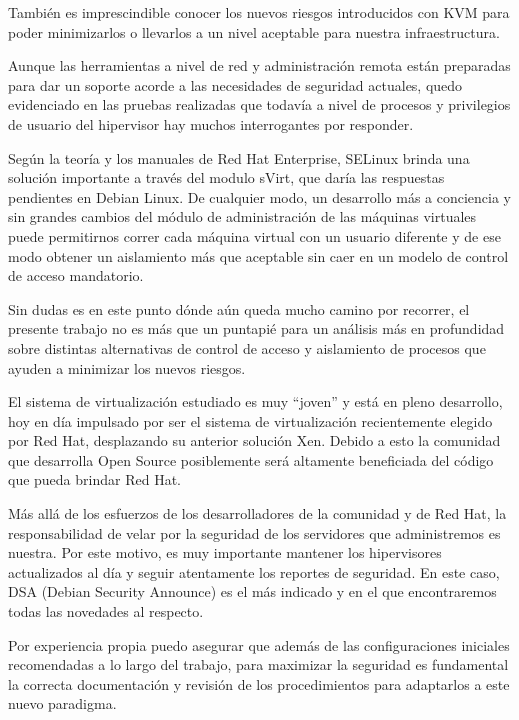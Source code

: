 	También es imprescindible conocer los nuevos riesgos
	introducidos con KVM para poder minimizarlos o llevarlos a un nivel
	aceptable para nuestra infraestructura.
\newline
	
	Aunque las herramientas a nivel de red y administración remota están
	preparadas para dar un soporte acorde a las necesidades de seguridad
	actuales, quedo evidenciado en las pruebas realizadas que todavía a nivel
	de procesos y privilegios de usuario del hipervisor hay muchos interrogantes
	por responder. \newline
	
	 Según la teoría y los manuales de Red Hat Enterprise,
	SELinux brinda una solución importante a través del modulo sVirt, que daría
	las respuestas pendientes en Debian Linux. De cualquier modo, un
	desarrollo más a conciencia y sin grandes cambios del módulo de
	administración de las máquinas virtuales puede permitirnos correr cada
	máquina virtual con un usuario diferente y de ese modo obtener un
	aislamiento más que aceptable sin caer en un modelo de control de acceso
	mandatorio. \newline
	
	Sin dudas es en este punto dónde aún queda mucho camino por
	recorrer, el presente trabajo no es más que un puntapié para un análisis más
	en profundidad sobre distintas alternativas de control de acceso y
	aislamiento de procesos que ayuden a minimizar los nuevos riesgos.
\newline
	
	El sistema de virtualización estudiado es muy “joven” y está en pleno
	desarrollo, hoy en día impulsado por ser el sistema de virtualización
	recientemente elegido por Red Hat, desplazando su anterior solución Xen.
	Debido a esto la comunidad que desarrolla Open Source posiblemente será
	altamente beneficiada del código que pueda brindar Red Hat.
\newline
	
	Más allá de los esfuerzos de los desarrolladores de la comunidad y de
	Red Hat, la responsabilidad de velar por la seguridad de los servidores que
	administremos es nuestra. Por este motivo, es muy importante mantener los
	hipervisores actualizados al día y seguir atentamente los reportes de
	seguridad. En este caso, DSA (Debian Security Announce) es el más
	indicado y en el que encontraremos todas las novedades al respecto.
\newline
	
	Por experiencia propia puedo asegurar que además de las
	configuraciones iniciales recomendadas a lo largo del trabajo, para
	maximizar la seguridad es fundamental la correcta documentación y revisión
	de los procedimientos para adaptarlos a este nuevo paradigma.
		
